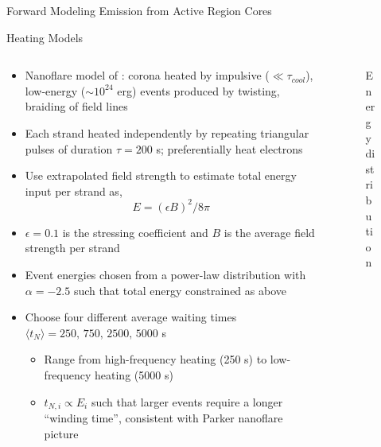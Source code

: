 \documentclass[final]{beamer}
\begin{document}
\begin{frame}
\begin{columns}[T]
\begin{column}{0.49\linewidth}
\begin{block}{Forward Modeling Emission from Active Region Cores}
    \end{block}
    \begin{block}{Heating Models}
      \begin{columns}[T]
      \begin{column}{0.49\columnwidth}
        \begin{itemize}
        \item Nanoflare model of \citet{parker_nanoflares_1988}: corona heated by impulsive ($\ll\tau_{cool}$), low-energy ($\sim10^{24}$ erg) events produced by twisting, braiding of field lines
        \item Each strand heated independently by repeating triangular pulses of duration $\tau=200$ s; preferentially heat electrons 
        \item Use extrapolated field strength to estimate total energy input per strand as,
          \begin{equation*}
            E = (\epsilon B)^2/8\pi
          \end{equation*}
        \item $\epsilon=0.1$ is the stressing coefficient and $B$ is the average field strength per strand
        \item Event energies chosen from a power-law distribution with $\alpha=-2.5$ such that total energy constrained as above
        \item Choose four different average waiting times $\langle t_N\rangle=250,\,750,\,2500,\,5000$ s 
        \begin{itemize}
          \item Range from high-frequency heating (250 s) to low-frequency heating (5000 s)
          \item $t_{N,i}\propto E_i$ such that larger events require a longer ``winding time'', consistent with Parker nanoflare picture \citep[e.g.][]{cargill_active_2014,barnes_inference_2016-1}
        \end{itemize}
        \end{itemize}
      \end{column}
      \begin{column}{0.49\columnwidth}
        \begin{figure}
        \caption{Energy distribution} 
        \label{fig:wait_times}

\end{figure}
\end{column}
\end{columns}
\end{block}
\end{column}
\end{columns}
\end{frame}
\end{document}
